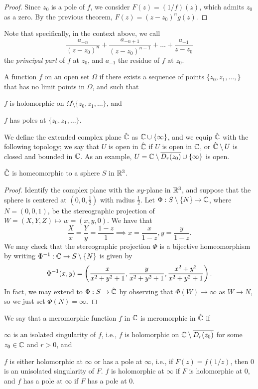 \begin{proof}
    Since $z_0$ is a pole of $f$, we consider $F(z) = (1/f)(z)$, which admits $z_0$ as a zero. By the previous theorem, $F(z) = (z - z_0)^n g(z)$. 
\end{proof}
\noindent Note that specifically, in the context above, we call
\[ \frac{a_{-n}}{(z - z_0)^n} + \frac{a_{-n+1}}{(z - z_0)^{n-1}} + \dots + \frac{a_{-1}}{z - z_0} \]
the \textit{principal part} of $f$ at $z_0$, and $a_{-1}$ the residue of $f$ at $z_0$.
\begin{definition}
    A function $f$ on an open set $\Omega$ if there exists a sequence of points $\{z_0, z_1, \dots, \}$ that has no limit points in $\Omega$, and such that \begin{parlist} \item $f$ is holomorphic on $\Omega \setminus \{z_0, z_1, \dots\}$, and \item $f$ has poles at $\{z_0, z_1, \dots\}$. \end{parlist}
\end{definition}
\noindent We define the extended complex plane $\hat {\mathbb C}$ as $\mathbb C \cup \{\infty\}$, and we equip $\hat {\mathbb C}$ with the following topology; we say that $U$ is open in $\hat {\mathbb C}$ if $U$ is open in $\mathbb C$, or $\hat {\mathbb C} \setminus U$ is closed and bounded in $\mathbb C$. As an example, $U = \mathbb C \setminus \overline{D_r(z_0)} \cup \{\infty\}$ is open.
\begin{proposition}
    $\hat {\mathbb C}$ is homeomorphic to a sphere $S$ in $\mathbb R^3$.
\end{proposition}
\begin{proof}
    Identify the complex plane with the $xy$-plane in $\mathbb R^3$, and suppose that the sphere is centered at $(0, 0, \frac{1}{2})$ with radius $\frac{1}{2}$. Let $\Phi : S \setminus \{N\} \to \mathbb C$, where $N = (0, 0, 1)$, be the stereographic projection of $W = (X, Y, Z) \mapsto w = (x, y, 0)$. We have that
    \[ \frac{X}{x} = \frac{Y}{y} = \frac{1-z}{1} \implies x = \frac{x}{1-z}, y = \frac{y}{1-z}. \]
    We may check that the stereographic projection $\Phi$ is a bijective homeomorphism by writing $\Phi^{-1} : \mathbb C \to S \setminus \{N\}$ is given by
    \[ \Phi^{-1}(x, y) = \left(\frac{x}{x^2 + y^2 + 1}, \frac{y}{x^2 + y^2 + 1}, \frac{x^2 + y^2}{x^2 + y^2 + 1}\right). \]
    In fact, we may extend to $\Phi : S \to \hat {\mathbb C}$ by observing that $\Phi(W) \to \infty$ as $W \to N$, so we just set $\Phi(N) = \infty$.
\end{proof}
\newpage
\noindent We say that a meromorphic function $f$ in $\mathbb C$ is meromorphic in $\hat {\mathbb C}$ if \begin{parlist} \item $\infty$ is an isolated singularity of $f$, i.e., $f$ is holomorphic on $\mathbb C \setminus \overline{D_r(z_0)}$ for some $z_0 \in \mathbb C$ and $r > 0$, and \item $f$ is either holomorphic at $\infty$ or has a pole at $\infty$, i.e., if $F(z) = f(1/z)$, then $0$ is an unisolated singularity of $F$. $f$ is holomorphic at $\infty$ if $F$ is holomorphic at $0$, and $f$ has a pole at $\infty$ if $F$ has a pole at $0$. \end{parlist}
